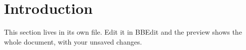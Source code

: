 \section{Introduction}
This section lives in its own file. Edit it in BBEdit and the preview
shows the whole document, with your unsaved changes.
